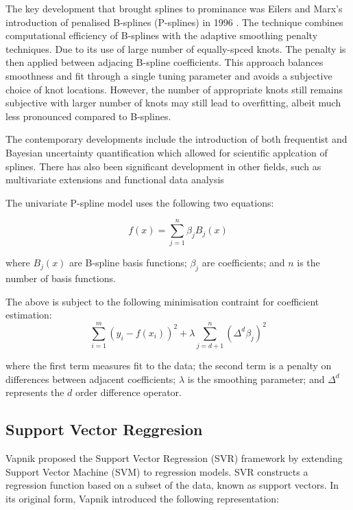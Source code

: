 \documentclass[8pt,twocolumn]{article}
\begin{document}
The key development that brought splines to prominance was Eilers and Marx's introduction
of penalised B-splines (P-splines) in 1996 \cite{eilmarx1996}. The technique combines computational
efficiency of B-splines with the adaptive smoothing penalty techniques. Due to its use of large
number of equally-spced knots. The penalty is then applied between adjacing B-spline coefficients.
This approach balances smoothness and fit through a single tuning parameter and avoids a subjective choice
of knot locations. However, the number of appropriate knots still remains subjective with larger number
of knots may still lead to overfitting, albeit much less pronounced compared to B-splines.

The contemporary developments include the introduction of both frequentist \cite{krivo2008} and
Bayesian \cite{woods2017} uncertainty quantification which allowed for scientific applcation of splines. There has also been
significant development in other fields, such as multivariate extensions and functional data analysis \cite{woods2017}

The univariate P-spline model uses the following two equations:

\begin{equation}
    f(x) = \sum_{j=1}^{n} \beta_j B_j(x)
\end{equation}

where $B_j(x)$ are B-spline basis functions; $\beta_j$ are coefficients;
and $n$ is the number of basis functions.

The above is subject to the following minimisation contraint for coefficient estimation:
\begin{equation}
    \sum_{i=1}^{m} (y_i - f(x_i))^2 + \lambda \sum_{j=d+1}^{n} (\Delta^d \beta_j)^2
\end{equation}

where the first term measures fit to the data; the second term is a penalty on differences between adjacent coefficients;
$\lambda$ is the smoothing parameter; and $\Delta^d$ represents the $d$ order difference operator.


\subsection{Support Vector Reggresion}
Vapnik \cite{vapnik1995nature} proposed the Support Vector Regression (SVR) framework
by extending Support Vector Machine (SVM) to regression models. SVR constructs a
regression function based on a subset of the data, known as support vectors. In its original form, Vapnik introduced the following representation:
\end{document}
